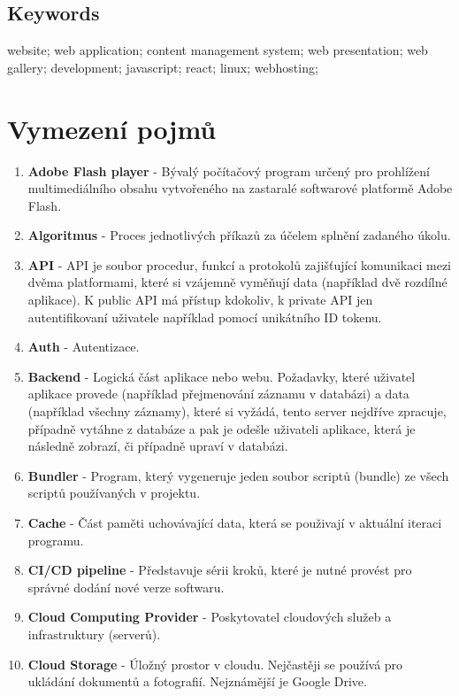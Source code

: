 \documentclass[12pt,a4paper]{report}
\begin{document}
  \section*{Keywords}
  \noindent website; web application; content management system; web presentation; web gallery; development; javascript; react; linux; webhosting;  

  \clearpage
  
  \tableofcontents
  
  \clearpage

  \chapter{Vymezení pojmů}
  \begin{enumerate}
    \item \textbf{Adobe Flash player} - Bývalý počítačový program určený pro prohlížení multimediálního obsahu vytvořeného na zastaralé softwarové platformě Adobe Flash.
    \item \textbf{Algoritmus} - Proces jednotlivých příkazů za účelem splnění zadaného úkolu.
    \item \textbf{API} - API je soubor procedur, funkcí a protokolů zajišťující komunikaci mezi dvěma platformami, které si vzájemně vyměňují data (například dvě rozdílné aplikace). K public API má přístup kdokoliv, k private API jen autentifikovaní uživatele například pomocí unikátního ID tokenu.
    \item \textbf{Auth} - Autentizace.
    \item \textbf{Backend} -  Logická část aplikace nebo webu. Požadavky, které uživatel aplikace provede (například přejmenování záznamu v databázi) a data (například všechny záznamy), které si vyžádá, tento server nejdříve zpracuje, případně vytáhne z databáze a pak je odešle uživateli aplikace, která je následně zobrazí, či případně upraví v databázi.
    \item \textbf{Bundler} - Program, který vygeneruje jeden soubor scriptů (bundle) ze všech scriptů používaných v projektu. 
    \item \textbf{Cache} - Část paměti uchovávající data, která se použivají v aktuální iteraci programu.
    \item \textbf{CI/CD pipeline} - Představuje sérii kroků, které je nutné provést pro správné dodání nové verze softwaru.
    \item \textbf{Cloud Computing Provider} - Poskytovatel cloudových služeb a infrastruktury (serverů).
    \item \textbf{Cloud Storage} - Úložný prostor v cloudu. Nejčastěji se používá pro ukládání dokumentů a fotografií. Nejznámější je Google Drive.

\end{enumerate}
\end{document}
